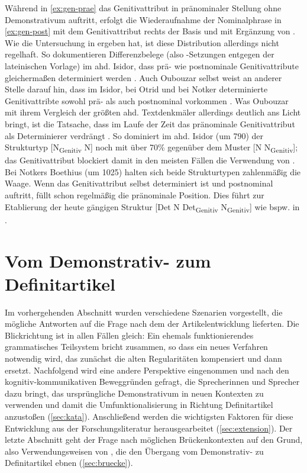 \noindent
Während in \ref{ex:gen-prae} das Genitivattribut  in pränominaler Stellung ohne Demonstrativum auftritt, erfolgt die Wiederaufnahme der Nominalphrase in \ref{ex:gen-post} mit dem Genitivattribut rechts der Basis und mit Ergänzung von . Wie die Untersuchung in \textcite{Szczepaniak2015} ergeben hat, ist diese Distribution allerdings nicht regelhaft. So dokumentieren Differenzbelege (also -Setzungen entgegen der lateinischen Vorlage) im ahd. Isidor, dass prä- wie postnominale Genitivattribute gleichermaßen determiniert werden \parencite[199]{Szczepaniak2015}. Auch Oubouzar selbst weist an anderer Stelle  darauf hin, dass im Isidor, bei Otrid und bei Notker determinierte Genitivattribte sowohl prä- als auch postnominal vorkommen \parencite[234]{Oubouzar1997}. Was Oubouzar mit ihrem Vergleich der größten ahd. Textdenkmäler allerdings deutlich ans Licht bringt, ist die Tatsache, dass  im Laufe der Zeit das pränominale Genitivattribut als Determinierer verdrängt \parencite[236ff.]{Oubouzar1997}. So dominiert im ahd. Isidor (um 790) der Strukturtyp [N\textsubscript{Genitiv} N] noch mit über 70\%  gegenüber dem Muster [N N\textsubscript{Genitiv}]; das Genitivattribut blockiert damit in den meisten Fällen die Verwendung von . Bei Notkers Boethius (um 1025) halten sich beide Strukturtypen zahlenmäßig die Waage. Wenn das Genitivattribut selbst determiniert ist und postnominal auftritt, füllt  schon regelmäßig die pränominale Position. Dies führt zur Etablierung der heute gängigen Struktur [Det N Det\textsubscript{Genitiv} N\textsubscript{Genitiv}] wie bspw. in  \parencite[241]{Oubouzar1997}. 

\section{Vom Demonstrativ- zum Definitartikel} \label{sec:demzudef}

Im vorhergehenden Abschnitt wurden verschiedene Szenarien vorgestellt, die mögliche Antworten auf die Frage nach dem  der Artikelentwicklung lieferten. Die Blickrichtung ist in allen Fällen gleich: Ein ehemals funktionierendes grammatisches Teilsystem bricht zusammen, so dass ein neues Verfahren notwendig wird, das zunächst die alten Regularitäten kompensiert und dann ersetzt. Nachfolgend wird eine andere Perspektive eingenommen und nach den kognitiv-kommunikativen Beweggründen gefragt, die Sprecherinnen und Sprecher dazu bringt, das ursprüngliche Demonstrativum in neuen Kontexten zu verwenden und damit die Umfunktionalisierung in Richtung Definitartikel anzustoßen  (\ref{sec:kata}). Anschließend werden die wichtigsten Faktoren für diese Entwicklung aus der Forschungsliteratur herausgearbeitet (\ref{sec:extension}). Der letzte Abschnitt geht der Frage nach möglichen Brückenkontexten auf den Grund, also Verwendungsweisen von , die den Übergang vom Demonstrativ- zu Definitartikel ebnen (\ref{sec:bruecke}).  

